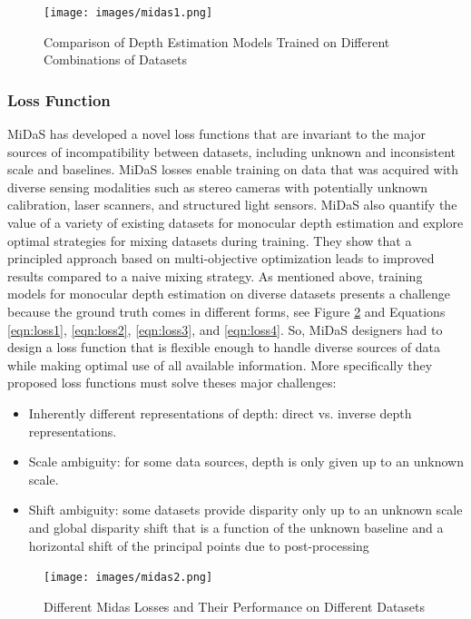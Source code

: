 \documentclass[a4paper, openany]{book}
\begin{document}
\begin{figure}[ht]
  \centering
    \texttt{[image: images/midas1.png]}
      \caption{Comparison of Depth Estimation Models Trained on Different Combinations of Datasets }
  \label{fig:midas1}
\end{figure}

\newpage

\subsubsection{Loss Function}
		\vspace{0.3cm}
		
		
MiDaS has developed a novel loss functions that are invariant to the major sources of incompatibility between datasets, including unknown and inconsistent scale and baselines. MiDaS losses enable training on data that was acquired with diverse sensing modalities such as stereo cameras with potentially unknown calibration, laser scanners, and structured light sensors. MiDaS also quantify the value of a variety of existing datasets for monocular depth estimation and explore optimal strategies for mixing datasets during training. They show that a principled approach based on multi-objective optimization leads to improved results compared to a naive mixing strategy.
As mentioned above, training models for monocular depth estimation on diverse datasets presents a challenge because the ground truth comes in different forms, see Figure \ref{fig:midas2} and Equations \ref{eqn:loss1}, \ref{eqn:loss2}, \ref{eqn:loss3}, and \ref{eqn:loss4}. So, MiDaS designers had  to design a loss function that is flexible enough to handle diverse sources of data while making optimal use of all available information. More specifically they proposed loss functions must solve theses major challenges:

\begin{itemize}
\item Inherently different representations of depth: direct vs. inverse depth representations.
\item Scale ambiguity: for some data sources, depth is only given up to an unknown scale. 
\item Shift ambiguity: some datasets provide disparity only up to an unknown scale and global disparity shift that is a function of the unknown baseline and a horizontal shift of the principal points due to post-processing 
\end{itemize}

\begin{figure}[ht]
  \centering
    \texttt{[image: images/midas2.png]}
      \caption{Different Midas Losses and Their Performance on Different Datasets
}
  \label{fig:midas2}
\end{figure}
\end{document}
